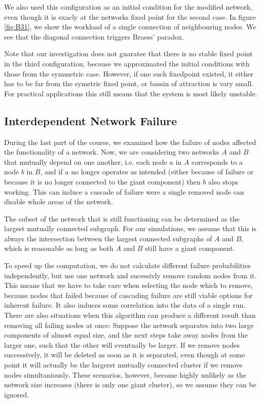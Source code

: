 \documentclass{scrartcl}
\begin{document}
We also used this configuration as an initial condition for the modified
network, even though it is exacly at the networks fixed point for the
second case. In figure \ref{fig:B31}, we show the workload of a single
connection of neighbouring nodes. We see that the diagonal connection
triggers Braess' paradox. 

Note that our investigation does not guaratee that there is no stable fixed
point in the third configuration, because we approximated the initial
conditions with those from the symmetric case. However, if one such
fixedpoint existed, it either has to be far from the symetric fixed point,
or bassin of attraction is vary small. For practical applications this
still means that the system is most likely unstable.



\subsection{Interdependent Network Failure}
During the last part of the course, we examined how the failure of nodes
affected the functionality of a network. Now, we are considering two
networks $A$ and $B$ that mutually depend on one another, i.e. each node
$a$ in $A$ corresponds to a node $b$ in $B$, and if $a$ no longer operates
as intended (either because of failure or because it is no longer connected
to the giant component) then $b$ also stops working.  This can induce
a cascade of failure were a single removed node can disable whole areas of
the network.

The subset of the network that is still functioning can be determined as
the largest mutually connected subgraph. For our simulations, we assume
that this is always the intersection between the largest connected
subgraphs of $A$ and $B$, which is reasonable as long as both $A$ and $B$
still have a giant component. 

To speed up the computation, we do not calculate different failure
probabilities independently, but use one network and sucessivly remove
random nodes from it. This means that we have to take care when selecting
the node which to remove, because nodes that failed because of cascading
failure are still viable options for inherent failure. It also induces some
correlation into the data of a single run.  There are also situations when
this algorithm can produce a different result than removing all failing
nodes at once: Suppose the network separates into two large components of
almost equal size, and the next steps take away nodes from the larger one,
such that the other will eventually be larger. If we remove nodes
successively, it will be deleted as soon as it is separated, even though at
some point it will actually be the largerst mutually connected cluster if
we remove nodes simultaniously.  These scenarios, however, become highly
unlikely as the network size increases (there is only one giant cluster),
so we assume they can be ignored. 
\end{document}
